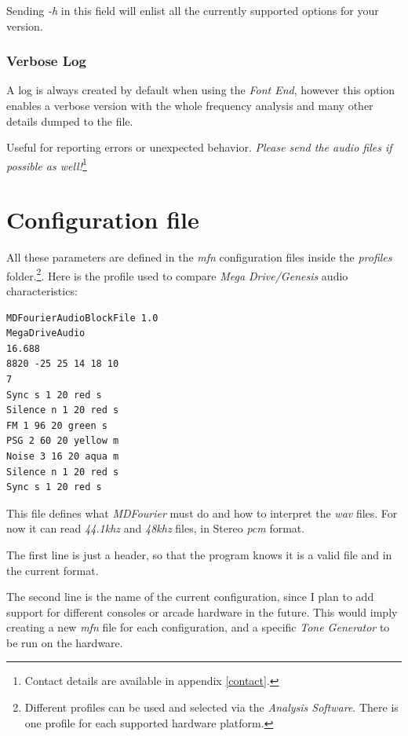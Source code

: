 \documentclass[10pt,a4paper]{report}
\newcommand{\ac}[1]{\textit{\acrshort{#1}}}
\newcommand{\khz}[1]{\textit{#1\acrshort{khz}}}
\begin{document}
\begin{appendices}
Sending \textit{-h} in this field will enlist all the currently supported options for your version.

\subsection{Verbose Log}
\label{verbose}

A log is always created by default when using the \textit{Font End}, however this option enables a verbose version with the whole frequency analysis and many other details dumped to the file. 

Useful for reporting errors or unexpected behavior. \textit{Please send the audio files if possible as well!}\footnote{Contact details are available in appendix \ref{contact}.}
	
\chapter{Configuration file}
\label{mfnconfig}

All these parameters are defined in the \textit{mfn} configuration files inside the \textit{profiles} folder.\footnote{Different profiles can be used and selected via the \textit{Analysis Software}. There is one profile for each supported hardware platform.}. Here is the profile used to compare \textit{Mega Drive/Genesis} audio characteristics:

\begin{verbatim}
MDFourierAudioBlockFile 1.0
MegaDriveAudio
16.688
8820 -25 25 14 18 10
7
Sync s 1 20 red s
Silence n 1 20 red s
FM 1 96 20 green s
PSG 2 60 20 yellow m
Noise 3 16 20 aqua m
Silence n 1 20 red s
Sync s 1 20 red s
\end{verbatim}

This file defines what \textit{MDFourier} must do and how to interpret the \ac{wav} files. For now it can read \khz{44.1} and \khz{48} files, in Stereo \ac{pcm} format.

The first line is just a header, so that the program knows it is a valid file and in the current format.

The second line is the name of the current configuration, since I plan to add support for different consoles or arcade hardware in the future. This would imply creating a new \textit{mfn} file for each configuration, and a specific \textit{Tone Generator} to be run on the hardware.


\end{appendices}
\end{document}

